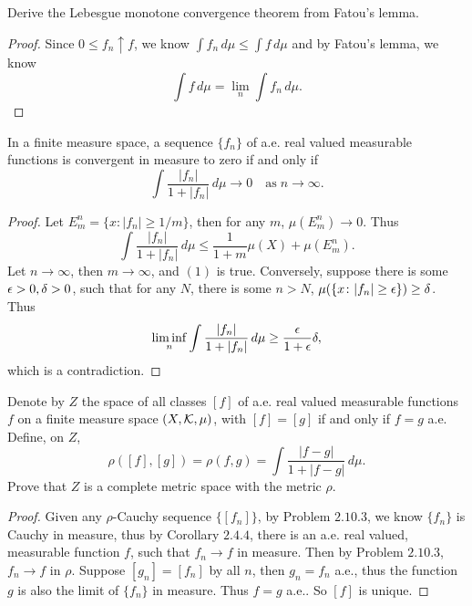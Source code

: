 \begin{pro}%
	Derive the Lebesgue monotone convergence theorem from Fatou's lemma.
\end{pro}
\begin{proof}
	Since $0\leq f_n\uparrow f$, we know $\int f_n\,d\mu\leq \int f\,d\mu$ and by Fatou's lemma, we know
	\[\int f\,d\mu=\lim_n \int f_n\,d\mu.\]
\end{proof}

\begin{pro}%
	In a finite measure space, a sequence $\{f_n\}$ of a.e. real valued measurable functions is convergent in measure to zero if and only if 
	\[\int \frac{|f_n|}{1+|f_n|}\,d\mu\to 0\quad\mbox{as}\;n\to\infty.\tag{1}\]
\end{pro}
\begin{proof}
	Let $E_m^n=\{x\colon |f_n|\geq 1/m\}$, then for any $m$, $\mu(E_m^n)\to 0$. Thus
	\[\int \frac{|f_n|}{1+|f_n|}\,d\mu\leq \frac{1}{1+m}\mu(X)+\mu(E_m^n).\]
	Let $n\to \infty$, then $m\to \infty$, and $(1)$ is true. Conversely, suppose there is some $\epsilon>0,\delta>0$, such that for any $N$, there is some $n>N$, $\mu(\{x\colon |f_n|\geq \epsilon\})\geq \delta$. Thus
	\[\liminf_n \int \frac{|f_n|}{1+|f_n|}\,d\mu\geq \frac{\epsilon}{1+\epsilon}\delta,\]
	which is a contradiction.
\end{proof}

\begin{pro}%
	Denote by $Z$ the space of all classes $[f]$ of a.e. real valued measurable functions $f$ on a finite measure space $(X,\mathcal{K},\mu)$, with $[f]=[g]$ if and only if $f=g$ a.e. Define, on $Z$,
	\[\rho([f],[g])=\rho(f,g)=\int \frac{|f-g|}{1+|f-g|}\,d\mu.\]
	Prove that $Z$ is a complete metric space with the metric $\rho$.
\end{pro}
\begin{proof}
	Given any $\rho$-Cauchy sequence $\{[f_n]\}$, by Problem $2.10.3$, we know $\{f_n\}$ is Cauchy in measure, thus by Corollary $2.4.4$, there is an a.e. real valued, measurable function $f$, such that $f_n\to f$ in measure. Then by Problem $2.10.3$, $f_n\to f$ in $\rho$. Suppose $[g_n]=[f_n]$ by all $n$, then $g_n=f_n$ a.e., thus the function $g$ is also the limit of $\{f_n\}$ in measure. Thus $f=g$ a.e.. So $[f]$ is unique.
\end{proof}

